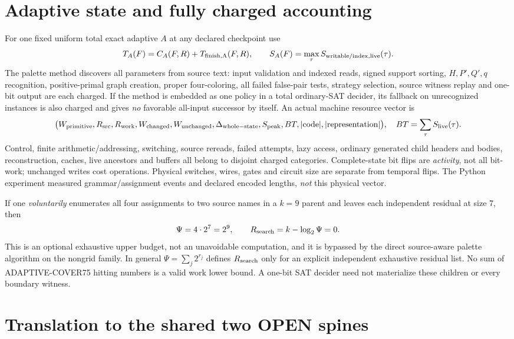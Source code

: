 \documentclass[11pt]{article}
\begin{document}
\section{Adaptive state and fully charged accounting}
For one fixed uniform total exact adaptive $A$ at any declared
checkpoint use
\[
T_A(F)=C_A(F,R)+T_{\rm finish,A}(F,R),\qquad
S_A(F)=\max_{\tau}S_{\rm writable/index,live}(\tau).
\]
The palette method discovers all parameters from source text:
input validation and indexed reads, signed support sorting,
$H,P',Q',q$ recognition, positive-primal graph creation,
proper four-coloring, all failed false-pair tests,
strategy selection, source witness replay and one-bit output
are each charged. If the method is embedded as one policy
in a total ordinary-SAT decider, its fallback on unrecognized
instances is also charged and gives \emph{no} favorable all-input
successor by itself. An actual machine resource vector is
\[
\bigl(W_{\rm primitive},R_{\rm src},R_{\rm work},
W_{\rm changed},W_{\rm unchanged},\Delta_{\rm whole-state},
S_{\rm peak},BT,|\mathrm{code}|,|\mathrm{representation}|\bigr),
\quad BT=\sum_{\tau}S_{\rm live}(\tau).
\]
Control, finite arithmetic/addressing, switching, source rereads,
failed attempts, lazy access, ordinary generated child headers
and bodies, reconstruction, caches, live ancestors and buffers
all belong to disjoint charged categories. Complete-state
bit flips are \emph{activity}, not all bit-work; unchanged
writes cost operations. Physical switches, wires, gates and
circuit size are separate from temporal flips. The Python
experiment measured grammar/assignment events and declared
encoded lengths, \emph{not} this physical vector.

If one \emph{voluntarily} enumerates all four assignments to two
source names in a $k=9$ parent and leaves each independent
residual at size $7$, then
\[
\Psi=4\cdot2^7=2^9,\qquad
R_{\rm search}=k-\log_2\Psi=0.
\]
This is an optional exhaustive upper budget, not an unavoidable
computation, and it is bypassed by the direct source-aware
palette algorithm on the nongrid family. In general
$\Psi=\sum_j2^{r_j}$ defines $R_{\rm search}$ only for an
explicit independent exhaustive residual list. No sum of
ADAPTIVE-COVER75 hitting numbers is a valid work lower bound.
A one-bit SAT decider need not materialize these children
or every boundary witness.

\section{Translation to the shared two OPEN spines}
\end{document}
